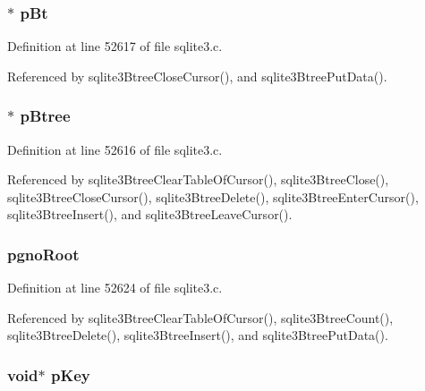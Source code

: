 \subsubsection[{p\+Bt}]{$\ast$ p\+Bt}\label{struct_bt_cursor_a2bc66d19c064bb25ff335241f8c621df}


Definition at line 52617 of file sqlite3.\+c.



Referenced by sqlite3\+Btree\+Close\+Cursor(), and sqlite3\+Btree\+Put\+Data().

\hypertarget{struct_bt_cursor_a8bc098d3190d7b0458b0f00fc3e9841b}{}
\subsubsection[{p\+Btree}]{$\ast$ p\+Btree}\label{struct_bt_cursor_a8bc098d3190d7b0458b0f00fc3e9841b}


Definition at line 52616 of file sqlite3.\+c.



Referenced by sqlite3\+Btree\+Clear\+Table\+Of\+Cursor(), sqlite3\+Btree\+Close(), sqlite3\+Btree\+Close\+Cursor(), sqlite3\+Btree\+Delete(), sqlite3\+Btree\+Enter\+Cursor(), sqlite3\+Btree\+Insert(), and sqlite3\+Btree\+Leave\+Cursor().

\hypertarget{struct_bt_cursor_a30f00f9ff785feab4d71f2cf58faab84}{}
\subsubsection[{pgno\+Root}]{ pgno\+Root}\label{struct_bt_cursor_a30f00f9ff785feab4d71f2cf58faab84}


Definition at line 52624 of file sqlite3.\+c.



Referenced by sqlite3\+Btree\+Clear\+Table\+Of\+Cursor(), sqlite3\+Btree\+Count(), sqlite3\+Btree\+Delete(), sqlite3\+Btree\+Insert(), and sqlite3\+Btree\+Put\+Data().

\hypertarget{struct_bt_cursor_af4e0ec7c9494e9d87e0042ab054ac58b}{}
\subsubsection[{p\+Key}]{\setlength{\rightskip}{0pt plus 5cm}void$\ast$ p\+Key}\label{struct_bt_cursor_af4e0ec7c9494e9d87e0042ab054ac58b}



